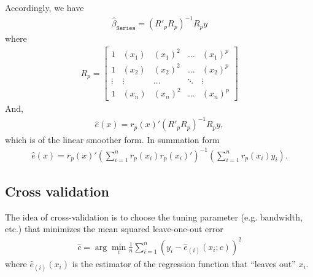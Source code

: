 \documentclass[12pt]{article}
\newcommand{\mtx}[1]{\ensuremath{\bm{\mathit{#1}}}}
\begin{document}
Accordingly, we have
\begin{align*}
\hat{\mtx{\beta}}_{\texttt{Series}} = \left(\mtx{R}'_p \mtx{R}_p \right)^{-1} \mtx{R}_p \mtx{y}
\end{align*}
where
\begin{align*}
\mtx{R}_p = 
\begin{bmatrix}
1 & (x_1) & (x_1)^2 & \dots& (x_1)^p \\
1 & (x_2) & (x_2)^2 & \dots &(x_2)^p\\
\vdots & \vdots & \dots & \ddots & \vdots \\
1 & (x_n) & (x_n)^2 & \dots &(x_n)^p
\end{bmatrix}
\end{align*}
And,
\begin{align*}
\hat e(x) =  \mtx{r}_p(x)' \left(\mtx{R}'_p \mtx{R}_p \right)^{-1} \mtx{R}_p \mtx{y},
\end{align*}
which is of the linear smoother form. In summation form
\begin{align*}
\hat e(x) =  \mtx{r}_p(x)' (\sum_{i=1}^n  \mtx{r}_p(x_i) \mtx{r}_p(x_i)')^{-1} (\sum_{i=1}^n  \mtx{r}_p(x_i) y_i).
\end{align*}

\subsection{Cross validation}
The idea of cross-validation is to choose the tuning parameter (e.g. bandwidth, etc.) that minimizes the mean squared leave-one-out error
\begin{align*}
\hat c = \arg \min_c \frac{1}{n} \sum_{i=1}^n (y_i - \hat e_{(i)}(x_i; c))^2
\end{align*}
where $\hat e_{(i)}(x_i)$ is the estimator of the regression function that ``leaves out'' $x_i$.\\ 
\end{document}
